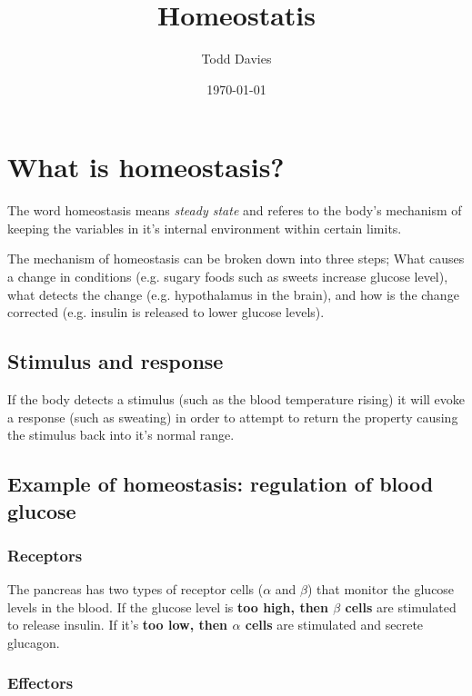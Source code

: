 \documentclass{article}
\title{Homeostatis}
\author{Todd Davies}
\date{\today}
\begin{document}
\lhead{\today}

\maketitle

\section*{What is homeostasis?}
\thispagestyle{empty}

The word homeostasis means {\it steady state} and referes to the body's
mechanism of keeping the variables in it's internal environment within certain
limits.

The mechanism of homeostasis can be broken down into three steps; What causes a
change in conditions (e.g. sugary foods such as sweets increase glucose level),
what detects the change (e.g. hypothalamus in the brain), and how is the change
corrected (e.g. insulin is released to lower glucose levels).

\subsection*{Stimulus and response}

If the body detects a stimulus (such as the blood temperature rising) it will
evoke a response (such as sweating) in order to attempt to return the property
causing the stimulus back into it's normal range.

\subsection*{Example of homeostasis: regulation of blood glucose}

\subsubsection*{Receptors}

The pancreas has two types of receptor cells ($\alpha$ and $\beta$) that monitor
the glucose levels in the blood. If the glucose level is {\bf too high, then
$\beta$ cells} are stimulated to release insulin. If it's {\bf too low, then
$\alpha$ cells} are stimulated and secrete glucagon.

\subsubsection*{Effectors}
\end{document}
